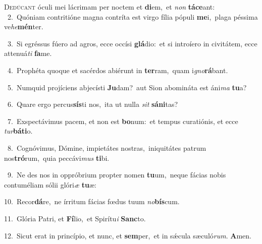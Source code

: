 \lettrine{\initial\textcolor{\initialcolor}{D}}{edúcant} óculi mei lácrimam per noctem et \textbf{di}\-em,~\star et \textit{non} \textbf{tá}\-\textbf{ce}ant:\\
{\numbfont\textcolor{\numbcolor}{~2.}}~Quóniam contritióne magna contríta est virgo fília pópuli \textbf{me}\-i,~\star plaga péssima ve\-\textit{he}\-\textbf{mén}ter.\par
{\numbfont\textcolor{\numbcolor}{~3.}}~Si egréssus fúero ad agros, ecce occísi \textbf{glá}\-dio:~\star et si introíero in civitátem, ecce attenuá\textit{ti} \textbf{fa}\-me.\par
{\numbfont\textcolor{\numbcolor}{~4.}}~Prophéta quoque et sacérdos abiérunt in \textbf{ter}\-ram,~\star quam i\-\textit{gno}\-\textbf{rá}bant.\par
{\numbfont\textcolor{\numbcolor}{~5.}}~Numquid projíciens abjecísti \textbf{Ju}\-dam?~\star aut Sion abomináta est áni\textit{ma} \textbf{tu}\-a?\par
{\numbfont\textcolor{\numbcolor}{~6.}}~Quare ergo percus\-\textbf{sís}\-ti nos,~\star ita ut nulla \textit{sit} \textbf{sá}\-\textbf{ni}tas?\par
{\numbfont\textcolor{\numbcolor}{~7.}}~Exspectávimus pacem, et non est \textbf{bo}\-num:~\star et tempus curatiónis, et ecce \textit{tur}\-\textbf{bá}\textbf{ti}o.\par
{\numbfont\textcolor{\numbcolor}{~8.}}~Cognóvimus, Dómine, impietátes nostras,~\dagger iniquitátes patrum nos\-\textbf{tró}\-rum,~\star quia peccávi\textit{mus} \textbf{ti}\-bi.\par
{\numbfont\textcolor{\numbcolor}{~9.}}~Ne des nos in oppróbrium propter nomen \textbf{tu}\-um,~\star neque fácias nobis contuméliam sólii glóri\textit{æ} \textbf{tu}\-æ:\par
{\numbfont\textcolor{\numbcolor}{10.}}~Recor\-\textbf{dá}\-re,~\star ne írritum fácias fœdus tuum \textit{no}\-\textbf{bís}cum.\par
{\numbfont\textcolor{\numbcolor}{11.}}~Glória Patri, et \textbf{Fí}\-lio,~\star et Spirítu\textit{i} \textbf{Sanc}\-to.\par
{\numbfont\textcolor{\numbcolor}{12.}}~Sicut erat in princípio, et nunc, et \textbf{sem}\-per,~\star et in sǽcula sæculó\-\textit{rum}\-. \textbf{A}\-men.\par
